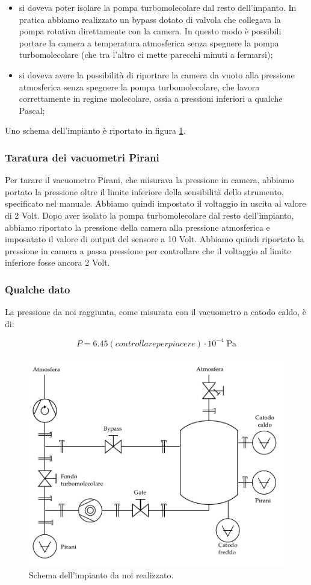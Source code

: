 \begin{itemize}
	\item{si doveva poter isolare la pompa turbomolecolare dal resto dell'impanto. In pratica abbiamo realizzato un bypass
    dotato di valvola che collegava la pompa rotativa direttamente con la camera. In questo modo è possibili portare la camera a
    temperatura atmosferica senza spegnere la pompa turbomolecolare (che tra l'altro ci mette parecchi minuti a fermarsi);}
	\item{si doveva avere la possibilità di riportare la camera da vuoto alla pressione atmosferica senza spegnere
    la pompa turbomolecolare, che lavora correttamente in regime molecolare, ossia a pressioni inferiori a qualche Pascal;}
\end{itemize}

Uno schema dell'impianto è riportato in figura \ref{fig:schema}.

\subsubsection{Taratura dei vacuometri Pirani}

Per tarare il vacuometro Pirani, che misurava la pressione in camera,
abbiamo portato la pressione oltre il limite inferiore
della sensibilità dello strumento, specificato nel manuale. Abbiamo quindi impostato il
voltaggio in uscita al valore di 2 Volt. Dopo aver isolato la pompa turbomolecolare dal resto
dell'impianto, abbiamo riportato la pressione della camera alla pressione atmosferica e
imposatato il valore di output del sensore a 10 Volt. Abbiamo quindi riportato la pressione in
camera a passa pressione per controllare che il voltaggio al limite inferiore fosse ancora 2 Volt.

\subsubsection{Qualche dato}

La pressione da noi raggiunta, come misurata con il vacuometro a catodo caldo, è di:

\begin{equation}
    P = 6.45 (controllare per piacere) \cdot 10^{-4} \; \si{\pascal}
\end{equation}

\begin{figure}[b!]
    \includegraphics[width=15cm]{drawing.pdf}
    \caption{Schema dell'impianto da noi realizzato.}
    \label{fig:schema}
\end{figure}
